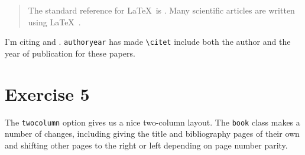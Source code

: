 \documentclass[10pt,a4paper]{article}
\begin{document}
    \begin{quote}
        The standard reference for \LaTeX~is \citep{Lamport:1994}. Many
        scientific articles are written using \LaTeX~\citep{Lamport:1994}.
    \end{quote}

    I'm citing \citet{brubaker2013lost} and \citet{velaga2012improving}.
    \texttt{authoryear} has made \texttt{\textbackslash citet} include both the
    author and the year of publication for these papers.

\section*{Exercise 5}

    The \texttt{twocolumn} option gives us a nice two-column layout. The
    \texttt{book} class makes a number of changes, including giving the title
    and bibliography pages of their own and shifting other pages to the right or
    left depending on page number parity.



\end{document}
